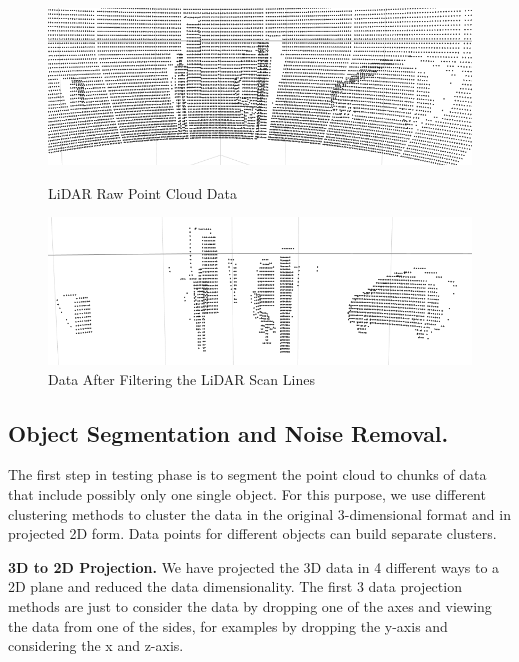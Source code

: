 \begin{figure}[!h]
\centering
\begin{minipage}{0.49\textwidth}
  \centering
        \includegraphics[width=.9\linewidth]{images/ground_before2.png}
        \caption{LiDAR Raw Point Cloud Data}
        \label{fig:ground_before}
\end{minipage}%
\begin{minipage}{0.49\textwidth}
  \centering
        \includegraphics[width=.9\linewidth]{images/ground_after2.png}
        \caption{Data After Filtering the LiDAR Scan Lines}
        \label{fig:after}
\end{minipage}%
\end{figure}
%
%
\subsection{Object Segmentation and Noise Removal.}
The first step in testing phase is to segment the point cloud to chunks of data that include
possibly only one single object. For this purpose, we use different clustering
methods to cluster the data in the original 3-dimensional format and in projected 2D form.
Data points for different objects can build separate clusters.


\textbf{3D to 2D Projection.}
We have projected the 3D data in 4 different ways to a 2D plane and reduced the data dimensionality.
The first 3 data projection methods are just to consider the data by dropping one of the axes and
viewing the data from one of the sides, for examples by dropping the y-axis and considering the x
and z-axis.

